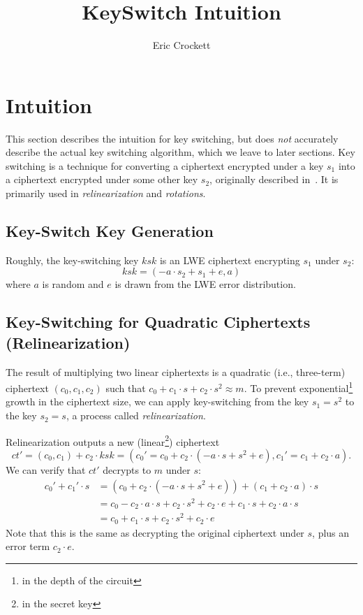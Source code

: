 \documentclass[../keyswitching.tex]{subfiles}
\title{KeySwitch Intuition}
\author{Eric Crockett}
\begin{document}
	\ifcompileasbook
	\else
	\maketitle
	\listoffixmes
	\fi

\section{Intuition}
\label{sec:intuition}
This section describes the intuition for key switching, but does \emph{not} accurately describe the actual key switching algorithm, which we leave to later sections.
Key switching is a technique for converting a ciphertext encrypted under a key $s_1$ into a ciphertext encrypted under some other key $s_2$, originally described in~\cite{cryptoeprint:2011/344}. It is primarily used in \emph{relinearization} and \emph{rotations}.

\subsection{Key-Switch Key Generation}
Roughly, the key-switching key $ksk$ is an LWE ciphertext encrypting $s_1$ under $s_2$:
\[ksk = (-a\cdot s_2 + s_1 + e, a)\]
where $a$ is random and $e$ is drawn from the LWE error distribution.

\subsection{Key-Switching for Quadratic Ciphertexts (Relinearization)}
The result of multiplying two linear ciphertexts is a quadratic (i.e., three-term) ciphertext $(c_0, c_1, c_2)$ such that $c_0 + c_1\cdot s + c_2\cdot s^2 \approx m$. To prevent exponential\footnote{in the depth of the circuit} growth in the ciphertext size, we can apply key-switching from the key $s_1=s^2$ to the key $s_2=s$, a process called \emph{relinearization}.

Relinearization outputs a new (linear\footnote{in the secret key}) ciphertext 
\[ct' = (c_0, c_1) + c_2\cdot ksk = (c_0'=c_0 + c_2\cdot(-a\cdot s + s^2 + e), c_1'=c_1 + c_2\cdot a).\] We can verify that $ct'$ decrypts to $m$ under $s$:
\begin{align*}
	c_0' + c_1'\cdot s &= (c_0 + c_2\cdot(-a\cdot s + s^2 + e)) + (c_1 + c_2\cdot a)\cdot s \\
	&= c_0 - c_2\cdot a\cdot s + c_2\cdot s^2 + c_2\cdot e + c_1\cdot s + c_2\cdot a\cdot s \\
	&= c_0 + c_1\cdot s + c_2\cdot s^2 + c_2\cdot e
\end{align*}
Note that this is the same as decrypting the original ciphertext under $s$, plus an error term $c_2\cdot e$.
\end{document}
